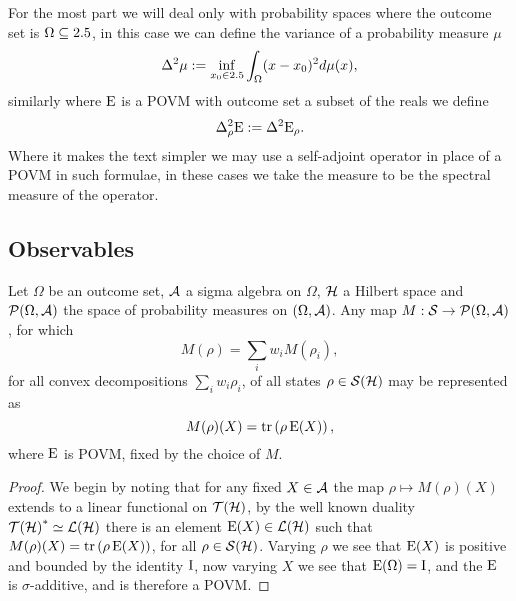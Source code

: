 For the most part we will deal only with probability spaces where the outcome set is $\Omega\subseteq2.5$, in this case we can define the variance of a probability measure $\mu$
\begin{align}
  \var{\mu} \defeq \inf_{x_0\in\R}\int_\Omega (x-x_0)^2 d\mu(x),
\end{align}
similarly where $\operatorname{E}$ is a POVM with outcome set a subset of the reals we define
\begin{align}
  \var[\rho]{\ope} \defeq \var{\ope_\rho}.
\end{align}
Where it makes the text simpler we may use a self-adjoint operator in place of a POVM in such formulae, in these cases we take the measure to be the spectral measure of the operator.


\subsection{Observables}

\begin{prop}\label{prop:povms-most-general-obs}
  Let $\Omega$ be an outcome set, $\mathcal{A}$ a sigma algebra on $\Omega$, $\mathcal{H}$ a Hilbert space and $\mathcal{P}\!\left({\Omega}, {\mathcal{A}}\right)$ the space of probability measures on $(\Omega, \mathcal{A})$. Any map $M:\dops\to\probs{\Omega}{\acal}$, for which 
  \begin{equation}\label{eq:obs-map-linear}
    M(\rho) = \sum_i w_i M(\rho_i),
  \end{equation}
  for all convex decompositions $\sum_i w_i \rho_i$, of all states $\rho\in\dops[\hcal]$ may be represented as
  \begin{equation}
    M(\rho)(X) = \operatorname{tr}\left( \rho\operatorname{E}(X) \right),
  \end{equation}
  where $\operatorname{E}$ is POVM, fixed by the choice of $M$.
\end{prop}

\begin{proof}
  We begin by noting that for any fixed $X\in\mathcal{A}$ the map $\rho\mapsto M(\rho)(X)$ extends to a linear functional on $\trops[\hcal]$, by the well known duality $\trops[\hcal]^* \simeq \bops[\hcal]$ there is an element $\ope(X)\in\bops[\hcal]$ such that $M(\rho)(X) = \operatorname{tr}\left( \rho\operatorname{E}(X) \right)$, for all $\rho\in\dops[\hcal]$. Varying $\rho$ we see that $\operatorname{E}(X)$ is positive and bounded by the identity $\operatorname{I}$, now varying $X$ we see that $\operatorname{E}(\Omega) = \operatorname{I}$, and the $\operatorname{E}$ is $\sigma$-additive, and is therefore a POVM.

\end{proof}

